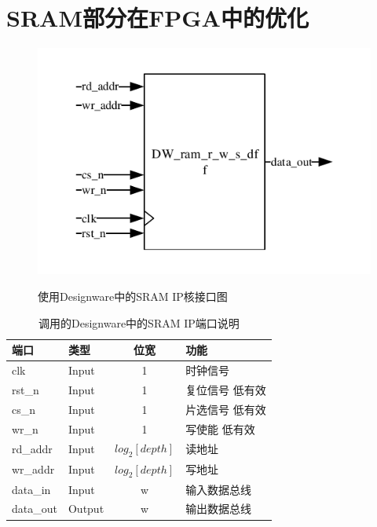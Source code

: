 \section{SRAM部分在FPGA中的优化}
\begin{figure}[h]
    \centering
    \includegraphics{../pdf/sram.pdf}\\
    \caption{使用Designware中的SRAM IP核接口图}
\end{figure}
\begin{table}[h] %
    \centering
    \caption{调用的Designware中的SRAM IP端口说明} %
    \begin{tabular}{l|l|c|l} %
    \hline  
    \hline  
    端口 & 类型 & 位宽 & 功能 \\ %
    \hline %
    clk & Input & 1 & 时钟信号 \\  
    \hline  
    rst\_n & Input & 1 & 复位信号 低有效 \\  
    \hline  
    cs\_n & Input & 1 & 片选信号 低有效 \\  
    \hline  
    wr\_n & Input & 1 & 写使能 低有效\\  
    \hline  
    rd\_addr & Input & $log_2[depth]$ & 读地址 \\  
    \hline  
    wr\_addr & Input & $log_2[depth]$ & 写地址 \\  
    \hline  
    data\_in & Input & w & 输入数据总线\\  
    \hline  
    data\_out & Output & w & 输出数据总线\\  
    \hline  
    \hline  
    \end{tabular}  
\end{table}


